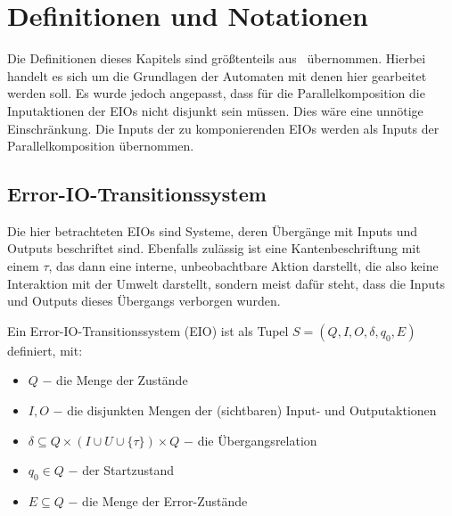 \chapter{Definitionen und Notationen}

Die Definitionen dieses Kapitels sind größtenteils aus~\cite{Vogler2014EIO}
übernommen. Hierbei handelt es sich um die Grundlagen der Automaten mit denen
hier gearbeitet werden soll. Es wurde jedoch angepasst, dass für die
Parallelkomposition die Inputaktionen der EIOs nicht disjunkt sein müssen. Dies
wäre eine unnötige Einschränkung. Die Inputs der zu komponierenden EIOs werden
als Inputs der Parallelkomposition übernommen.

\section{Error-IO-Transitionssystem}
Die hier betrachteten EIOs sind Systeme, deren Übergänge mit Inputs und Outputs
beschriftet sind. Ebenfalls zulässig ist eine Kantenbeschriftung mit einem
$\tau$, das dann eine interne, unbeobachtbare Aktion darstellt, die also keine Interaktion mit
der Umwelt darstellt, sondern meist dafür steht, dass die Inputs und Outputs
dieses Übergangs verborgen wurden.

\begin{Def}
  Ein Error-IO-Transitionssystem (EIO) ist
  als Tupel $S=(Q,I,O,\delta, q_0, E)$ definiert, mit:
  \begin{itemize}
    \item $Q$ $-$ die Menge der Zustände
    \item $I,O$ $-$ die disjunkten Mengen der (sichtbaren) Input- und Outputaktionen
    \item $\delta\subseteq Q\times (I\cup U\cup\{\tau\})\times Q$ $-$ die
      Übergangsrelation
    \item $q_0\in Q$ $-$ der Startzustand
    \item $E\subseteq Q$ $-$ die Menge der Error-Zustände
  \end{itemize}
\end{Def}

